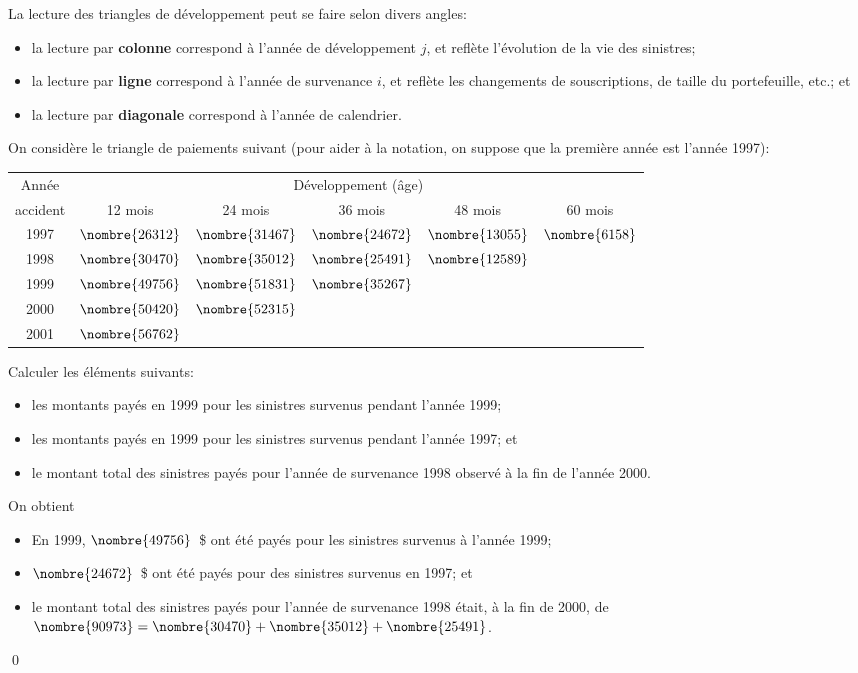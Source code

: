 La lecture des triangles de développement peut se faire selon divers
angles:
\begin{itemize}
\item la lecture par \textbf{colonne} correspond à l'année de
  développement $j$, et reflète l'évolution de la vie des sinistres;
\item la lecture par \textbf{ligne} correspond à l'année de survenance
  $i$, et reflète les changements de souscriptions, de taille du
  portefeuille, etc.; et
\item la lecture par \textbf{diagonale} correspond à l'année de
  calendrier.
\end{itemize}

\begin{exemple}
  On considère le triangle de paiements suivant (pour aider à la
  notation, on suppose que la première année est l'année 1997):
  \begin{center}
    \begin{tabular}{*{6}{c}}
      \toprule
      Année & \multicolumn{5}{c}{Développement (âge)} \\
      accident& 12 mois & 24 mois & 36 mois & 48 mois & 60 mois \\
      \midrule
      1997 & $\nombre{26312}$ & $\nombre{31467}$ & $\nombre{24672}$ & $\nombre{13055}$ & $\nombre{6158}$ \\
      1998 & $\nombre{30470}$ & $\nombre{35012}$ & $\nombre{25491}$ & $\nombre{12589}$ \\
      1999 & $\nombre{49756}$ & $\nombre{51831}$ & $\nombre{35267}$ \\
      2000 & $\nombre{50420}$ & $\nombre{52315}$ \\
      2001 & $\nombre{56762}$ \\
      \bottomrule
    \end{tabular}
  \end{center}
  Calculer les éléments suivants:

  \begin{itemize}
  \item les montants payés en 1999 pour les sinistres survenus pendant
    l'année 1999;
  \item les montants payés en 1999 pour les sinistres survenus pendant
    l'année 1997; et
  \item le montant total des sinistres payés pour l'année de
    survenance 1998 observé à la fin de l'année 2000.
  \end{itemize}

  On obtient
  \begin{itemize}
  \item En 1999, $\nombre{49756}$~\$ ont été payés pour les sinistres
    survenus à l'année 1999;
  \item $\nombre{24672}$~\$ ont été payés pour des sinistres survenus
    en 1997; et
  \item le montant total des sinistres payés pour l'année de
    survenance 1998 était, à la fin de 2000, de
    $\nombre{90973} = \nombre{30470} + \nombre{35012} +
    \nombre{25491}$.
  \end{itemize}
  \qed
\end{exemple}

